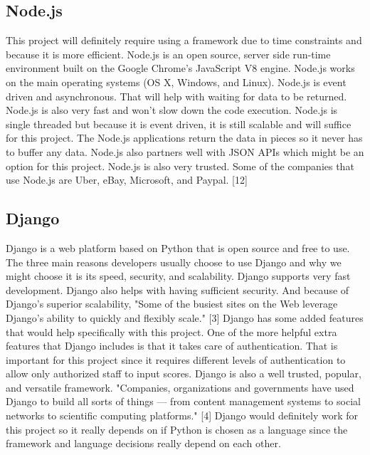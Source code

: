 \documentclass[letterpaper,10pt,draftclsnofoot,onecolumn,]{article}
\begin{document}
\subsection{Node.js}
This project will definitely require using a framework due to time constraints and because it is more efficient. Node.js is an open source, server side run-time environment built on the Google Chrome's JavaScript V8 engine. Node.js works on the main operating systems (OS X, Windows, and Linux). Node.js is event driven and asynchronous. That will help with waiting for data to be returned. Node.js is also very fast and won't slow down the code execution. Node.js is single threaded but because it is event driven, it is still scalable and will suffice for this project. The Node.js applications return the data in pieces so it never has to buffer any data. Node.js also partners well with JSON APIs which might be an option for this project. Node.js is also very trusted. Some of the companies that use Node.js are Uber, eBay, Microsoft, and Paypal. [12]

\subsection{Django}
Django is a web platform based on Python that is open source and free to use. The three main reasons developers usually choose to use Django and why we might choose it is its speed, security, and scalability. Django supports very fast development. Django also helps with having sufficient security. And because of Django's superior scalability, "Some of the busiest sites on the Web leverage Django’s ability to quickly and flexibly scale." [3] Django has some added features that would help specifically with this project. One of the more helpful extra features that Django includes is that it takes care of authentication. That is important for this project since it requires different levels of authentication to allow only authorized staff to input scores. Django is also a well trusted, popular, and versatile framework. "Companies, organizations and governments have used Django to build all sorts of things — from content management systems to social networks to scientific computing platforms." [4] Django would definitely work for this project so it really depends on if Python is chosen as a language since the framework and language decisions really depend on each other.
\end{document}
